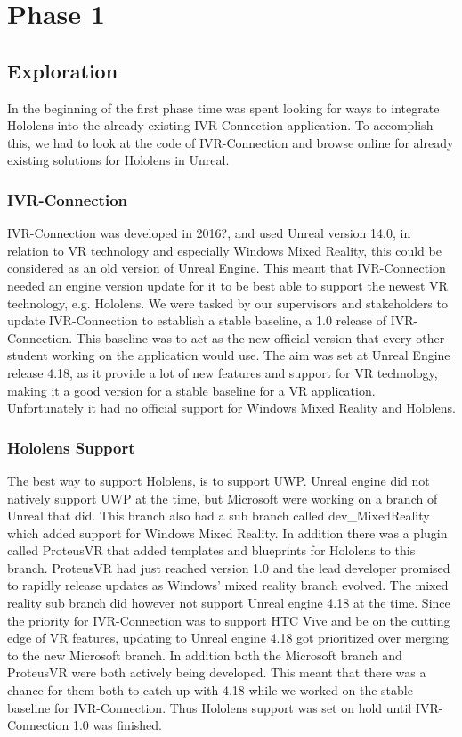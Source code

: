 \chapter{Phase 1}
    \section{Exploration}
    In the beginning of the first phase time was spent looking for ways to integrate Hololens into the already existing IVR-Connection application. To accomplish this, we had to look at the code of IVR-Connection and browse online for already existing solutions for Hololens in Unreal.
    
        \subsection{IVR-Connection}
        IVR-Connection was developed in 2016?, and used Unreal version 14.0, in relation to VR technology and especially Windows Mixed Reality, this could be considered as an old version of Unreal Engine. This meant that IVR-Connection needed an engine version update for it to be best able to support the newest VR technology, e.g. Hololens. We were tasked by our supervisors and stakeholders to update IVR-Connection to establish a stable baseline, a 1.0 release of IVR-Connection. This baseline was to act as the new official version that every other student working on the application would use. The aim was set at Unreal Engine release 4.18, as it provide a lot of new features and support for VR technology, making it a good version for a stable baseline for a VR application. Unfortunately it had no official support for Windows Mixed Reality and Hololens.
        
        
        \subsection{Hololens Support}
        The best way to support Hololens, is to support UWP. Unreal engine did not natively support UWP at the time, but Microsoft were working on a branch of Unreal that did. This branch also had a sub branch called dev\_MixedReality which added support for Windows Mixed Reality. In addition there was a plugin called ProteusVR that added templates and blueprints for Hololens to this branch. ProteusVR had just reached version 1.0 and the lead developer promised to rapidly release updates as Windows' mixed reality branch evolved. The mixed reality sub branch did however not support Unreal engine 4.18 at the time. Since the priority for IVR-Connection was to support HTC Vive and be on the cutting edge of VR features, updating to Unreal engine 4.18 got prioritized over merging to the new Microsoft branch. In addition both the Microsoft branch and ProteusVR were both actively being developed. This meant that there was a chance for them both to catch up with 4.18 while we worked on the stable baseline for IVR-Connection. Thus Hololens support was set on hold until IVR-Connection 1.0 was finished.
        
